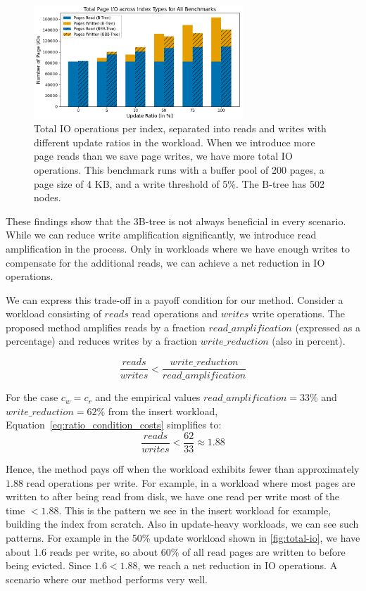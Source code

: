 \begin{figure}[htbp]
  \centering
  \includegraphics[width=0.7\textwidth]{figures/evaluation/pageviews_total_io_across_update_ratios.png}
    \caption{Total \ac{IO} operations per index, separated into reads and writes with different update ratios in the workload. When we introduce more page reads than we save page writes, we have more total \ac{IO} operations. This benchmark runs with a buffer pool of 200 pages, a page size of 4 KB, and a write threshold of 5\%. The B-tree has 502 nodes.}
  \label{fig:total-io}
\end{figure}

These findings show that the 3B-tree is not always beneficial in every scenario.
While we can reduce write amplification significantly, we introduce read amplification in the process.
Only in workloads where we have enough writes to compensate for the additional reads, we can achieve a net reduction in \ac{IO} operations.

We can express this trade-off in a payoff condition for our method.
Consider a workload consisting of $reads$ read operations and $writes$ write operations.
The proposed method amplifies reads by a fraction $read\_amplification$ (expressed as a percentage)  
and reduces writes by a fraction $write\_reduction$ (also in percent).

\begin{equation}
\frac{reads}{writes} < \frac{write\_reduction}{read\_amplification}
\label{eq:ratio_condition}
\end{equation}

For the case $c_w = c_r$ and the empirical values
$read\_amplification = 33\%$ and $write\_reduction = 62\%$ from the insert workload,  
Equation~\ref{eq:ratio_condition_costs} simplifies to:
\begin{equation}
\frac{reads}{writes} < \frac{62}{33} \approx 1.88
\end{equation}

Hence, the method pays off when the workload exhibits fewer than approximately $1.88$ read operations per write.
For example, in a workload where most pages are written to after being read from disk, we have one read per write most of the time $< 1.88$.
This is the pattern we see in the insert workload for example, building the index from scratch.
Also in update-heavy workloads, we can see such patterns.
For example in the 50\% update workload shown in \autoref{fig:total-io}, we have about 1.6 reads per write, so about 60\% of all read pages are written to before being evicted.
Since $1.6 < 1.88$, we reach a net reduction in \ac{IO} operations.
A scenario where our method performs very well. 

